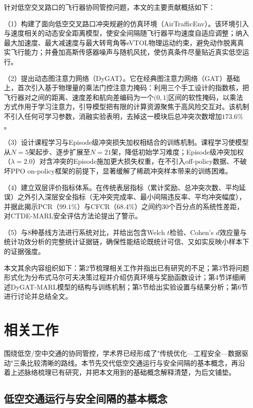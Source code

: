 \documentclass[12pt,a4paper,UTF8]{ctexart}
\begin{document}
针对低空交叉路口的飞行器协同管控问题，本文的主要贡献概括如下：

（1）构建了面向低空交叉路口冲突规避的仿真环境（AirTrafficEnv）。该环境引入与速度相关的动态安全距离模型，使安全间隔随飞行器平均速度自适应调整；纳入最大加速度、最大减速度与最大转弯角等eVTOL物理运动约束，避免动作脱离真实飞行能力；并叠加高斯传感器噪声与随机风扰，使仿真条件尽量贴近真实低空运行。

（2）提出动态图注意力网络（DyGAT）。它在经典图注意力网络（GAT）基础上，首次引入基于物理量的乘法门控注意力掩码：利用三个手工设计的指数核，把飞行器对之间的距离、速度差和航向差编码为一个$(0,1]$区间的软性掩码，以乘法方式作用于学习注意力，引导模型把有限的计算资源聚焦于高风险交互对。该机制不引入任何可学习参数，消融实验表明，去掉这一模块后总冲突次数增加$173.6\%$。

（3）设计课程学习与Episode级冲突损失加权相结合的训练机制。课程学习使模型从$N=5$架起步、逐步扩展至$N=21$架，降低初始学习难度；Episode级冲突加权（$\lambda=2.0$）对含冲突的Episode施加更大损失权重，在不引入off-policy数据、不破坏PPO on-policy框架的前提下，显著缓解了稀疏冲突样本带来的训练困难。

（4）建立双层评价指标体系。在传统表层指标（累计奖励、总冲突次数、平均延误）之外引入深层安全指标（无冲突完成率、最小间隔违反率、平均冲突幅度），并据此揭示PCR（$99.1\%$）与CFCR（$68.4\%$）之间约30个百分点的系统性差距，对CTDE-MARL安全评估方法论提出了警示。

（5）与8种基线方法进行系统对比，并给出包含Welch $t$检验、Cohen's $d$效应量与统计功效分析的完整统计证据链，确保性能结论既统计可信、又如实反映小样本下的证据强度。

本文其余内容组织如下：第2节梳理相关工作并指出已有研究的不足；第3节将问题形式化为分布式马尔可夫决策过程并介绍仿真环境与奖励函数设计；第4节详细阐述DyGAT-MARL模型的结构与训练机制；第5节给出实验设置与结果分析；第6节进行讨论并总结全文。

\section{相关工作}

围绕低空/空中交通的协同管控，学术界已经形成了"传统优化—工程安全—数据驱动"三条比较清晰的路线。本节先交代低空交通运行与安全间隔的基本概念，再沿着上述脉络梳理已有研究，并把本文用到的基础概念解释清楚，为后文铺垫。

\subsection{低空交通运行与安全间隔的基本概念}
\end{document}
